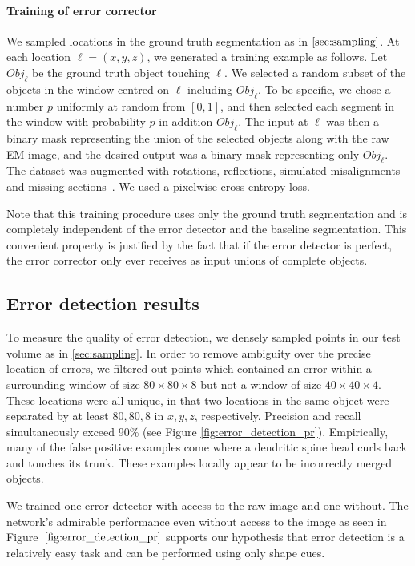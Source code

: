 \documentclass{article}
\begin{document}
\paragraph{Training of error corrector}
We sampled locations in the ground truth segmentation as in $\ref{sec:sampling}$. At each location $\ell = (x,y,z)$, we generated a training example as follows. Let $Obj_\ell$ be the ground truth object touching $\ell$. We selected a random subset of the objects in the window centred on $\ell$ including $Obj_\ell$. To be specific, we chose a number $p$ uniformly at random from $[0,1]$, and then selected each segment in the window with probability $p$ in addition $Obj_\ell$. The input at $\ell$ was then a binary mask representing the union of the selected objects along with the raw EM image, and the desired output was a binary mask representing only $Obj_\ell$. The dataset was augmented with rotations, reflections, simulated misalignments and missing sections~\cite{kisuk}. We used a pixelwise cross-entropy loss.

Note that this training procedure uses only the ground truth segmentation and is completely independent of the error detector and the baseline segmentation. This convenient property is justified by the fact that if the error detector is perfect, the error corrector only ever receives as input unions of complete objects.

\subsection{Error detection results}
\label{sec:detection_results}
To measure the quality of error detection, we densely sampled points in our test volume as in \ref{sec:sampling}. In order to remove ambiguity over the precise location of errors, we filtered out points which contained an error within a surrounding window of size $80\times80\times 8$ but not a window of size $40\times 40 \times 4$. These locations were all unique, in that two locations in the same object were separated by at least $80,80,8$ in $x,y,z$, respectively. Precision and recall simultaneously exceed 90\% (see Figure \ref{fig:error_detection_pr}). Empirically, many of the false positive examples come where a dendritic spine head curls back and touches its trunk. These examples locally appear to be incorrectly merged objects.

We trained one error detector with access to the raw image and one without. The network's admirable performance even without access to the image as seen in Figure~$\ref{fig:error_detection_pr}$ supports our hypothesis that error detection is a relatively easy task and can be performed using only shape cues.
\end{document}
